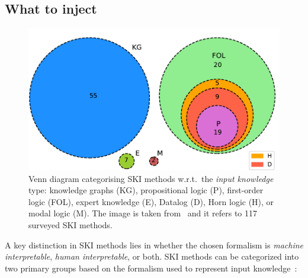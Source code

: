 \subsection{What to inject}\label{subsec:what-to-inject}
%
\begin{figure}
    \centering
    \includegraphics[width=.6\linewidth]{figures/ski-logic}
    \caption[Venn diagram categorising SKI methods w.r.t. the input knowledge type]{
        Venn diagram categorising SKI methods w.r.t.\ the \emph{input knowledge} type: knowledge graphs (KG), propositional logic (P), first-order logic (FOL), expert knowledge (E), Datalog (D), Horn logic (H), or modal logic (M).
        The image is taken from~\cite{DBLP:journals/csur/CiattoSAMO24} and it refers to 117 surveyed \gls{SKI} methods.
    }
    \label{fig:pie-ski-logic}
\end{figure}
%
%
A key distinction in \gls{SKI} methods lies in whether the chosen formalism is \emph{machine interpretable}, \emph{human interpretable}, or both.
%
\Gls{SKI} methods can be categorized into two primary groups based on the formalism used to represent input knowledge~\cite{DBLP:journals/csur/CiattoSAMO24}:
%
